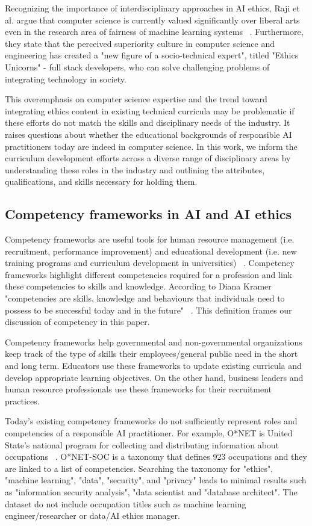 \documentclass[sigconf]{acmart}
\begin{document}
Recognizing the importance of interdisciplinary approaches in AI ethics, Raji et al. argue that computer science is currently valued significantly over liberal arts even in the research area of fairness of machine learning systems ~\cite{Raji2021}. Furthermore, they state that the perceived superiority culture in computer science and engineering has created a "new figure of a socio-technical expert", titled "Ethics Unicorns" - full stack developers, who can solve challenging problems of integrating technology in society.  

This overemphasis on computer science expertise and the trend toward integrating ethics content in existing technical curricula may be problematic if these efforts do not match the skills and disciplinary needs of the industry. It raises questions about whether the educational backgrounds of responsible AI practitioners today are indeed in computer science. In this work, we inform the curriculum development efforts across a diverse range of disciplinary areas by understanding these roles in the industry and outlining the attributes, qualifications, and skills necessary for holding them. 
 
\subsection{Competency frameworks in AI and AI ethics}
\label{competencyframework}
Competency frameworks are useful tools for human resource management (i.e. recruitment, performance improvement) and educational development (i.e. new training programs and curriculum development in universities) ~\cite{CIPD,Spencer1993}. Competency frameworks highlight different competencies required for a profession and link these competencies to skills and knowledge. According to Diana Kramer "competencies are skills, knowledge and behaviours that individuals need to possess to be successful today and in the future" ~\cite{Sanghi2016}. This definition frames our discussion of competency in this paper. 

Competency frameworks help governmental and non-governmental organizations keep track of the type of skills their employees/general public need in the short and long term. Educators use these frameworks to update existing curricula and develop appropriate learning objectives. On the other hand, business leaders and human resource professionals use these frameworks for their recruitment practices.


Today's existing competency frameworks do not sufficiently represent roles and competencies of a responsible AI practitioner. For example, O*NET is United State's national program for collecting and distributing information about occupations ~\cite{Administration}. O*NET-SOC is a taxonomy that defines 923 occupations and they are linked to a list of competencies. Searching the taxonomy for "ethics", "machine learning", "data", "security", and "privacy" leads to minimal results such as "information security analysis", "data scientist and "database architect". The dataset do not include occupation titles such as machine learning engineer/researcher or data/\ac{AI} ethics manager. 
\end{document}
